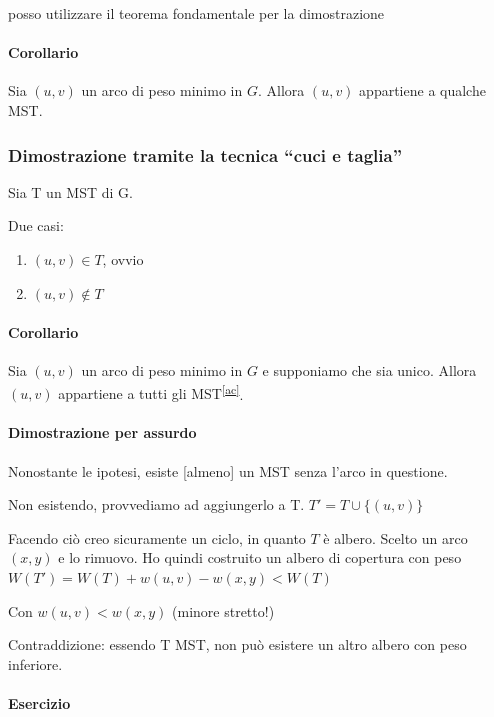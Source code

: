 {posso utilizzare il teorema fondamentale per la dimostrazione}

\paragraph{Corollario}

{Sia $(u,v)$ un arco di peso minimo in $G$. Allora $(u,v)$ appartiene a qualche MST.}

\subsubsection{Dimostrazione tramite la tecnica ``cuci e taglia''}

{Sia T un MST di G. }

{Due casi:}

\begin{enumerate}
\tightlist
\item
  $(u,v)\in T${, ovvio}
\item
  $(u,v)\notin T$
\end{enumerate}

\paragraph{Corollario}

{Sia $(u,v)$ un arco di peso minimo in $G$ e supponiamo che sia unico. Allora $(u,v)$ appartiene a tutti gli MST}\textsuperscript{\protect\hyperlink{cmnt29}{{[}ac{]}}}{.}

\paragraph{Dimostrazione per assurdo}

{Nonostante le ipotesi, esiste {[}almeno{]} un MST senza l'arco in
questione.}

{Non esistendo, provvediamo ad aggiungerlo a T. $T' = T \cup \{(u,v)\}$}

{Facendo ciò creo sicuramente un ciclo, in quanto $T$ è albero. Scelto un arco $(x,y)$ e lo rimuovo. Ho quindi costruito un albero di copertura con peso $W(T') = W(T) + w(u,v) - w(x,y) < W(T)$}

{Con $w(u,v) < w(x,y)$ (minore stretto!)}

{Contraddizione}{: essendo T MST, non può esistere un altro albero con peso inferiore.}

\paragraph{Esercizio}

